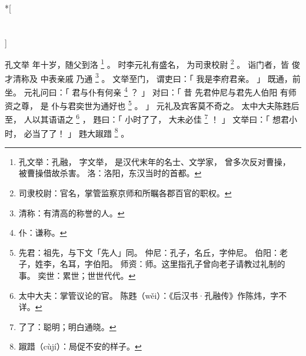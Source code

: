 
\switchcolumn[0]*[\section{}]

孔文举
年十岁，随父到洛%
\footnote{%
    孔文举：孔融，
            字文举，
            是汉代末年的名士、文学家，
            曾多次反对曹操，
            被曹操借故杀害。
    洛：洛阳，东汉当时的首都。
}%
。
时李元礼有盛名，
为司隶校尉%
\footnote{%
    司隶校尉：官名，掌管监察京师和所瞩各郡百官的职权。
}%
。
诣门者，皆
    俊才清称及
    中表亲戚
乃通%
\footnote{%
    清称：有清高的称誉的人。
}%
。
文举至门，
谓吏曰：「
    我是李府君亲。
」
既通，前坐。
元礼问曰：「
    君与仆有何亲%
    \footnote{%
        仆：谦称。
    }%
    ？
」
对曰：「
    昔
    先君仲尼与君先人伯阳
    有师资之尊，
    是
    仆与君奕世为通好也%
    \footnote{%
        先君：祖先，与下文「先人」同。
        仲尼：孔子，名丘，字仲尼。
        伯阳：老子，姓李，名耳，字伯阳。
        师资：师。这里指孔子曾向老子请教过礼制的事。
        奕世：累世；世世代代。
    }%
    。
」
元礼及宾客莫不奇之。
太中大夫陈韪后至，
人以其语语之%
\footnote{%
    太中大夫：掌管议论的官。
    陈韪（wěi）：《后汉书·孔融传》作陈炜，字不详。
}%
，
韪曰：「
    小时了了，
    大未必佳%
    \footnote{%
        了了：聪明；明白通晓。
    }%
    ！
」
文举曰：「
    想君小时，
    必当了了！
」
韪大踧踖%
\footnote{%
    踧踖（cùjí）：局促不安的样子。
}%
。

\switchcolumn



